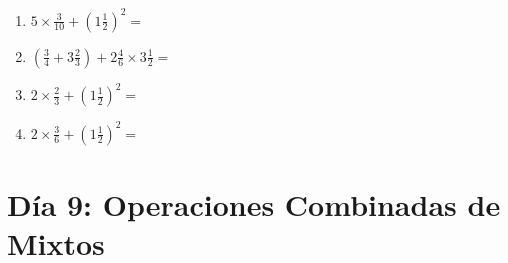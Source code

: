 \documentclass[12pt]{article}
\begin{document}
\begin{enumerate}
\item \large $ 5 \times \frac{3}{10} + (1 \frac{1}{2})^2 = $ \vspace{1.8cm}
\item \large $ (\frac{3}{4} + 3 \frac{2}{3}) + 2 \frac{4}{6} \times 3 \frac{1}{2} = $ \vspace{1.8cm}
\item \large $ 2 \times \frac{2}{3} + (1 \frac{1}{2})^2 = $ \vspace{1.8cm}
\item \large $ 2 \times \frac{3}{6} + (1 \frac{1}{2})^2 = $ \vspace{1.8cm}
\end{enumerate}\newpage
\section*{Día 9: Operaciones Combinadas de Mixtos}
\end{document}
